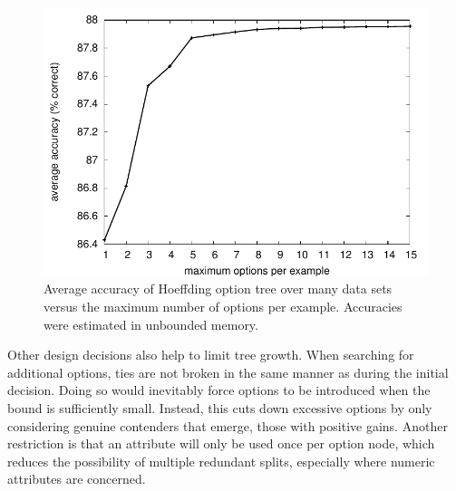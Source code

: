 \begin{figure}
\includegraphics{figures/maxOptionAcc}
\caption{Average accuracy of Hoeffding option tree over many data sets versus the maximum number of options per example. Accuracies were estimated in unbounded memory.}
\label{fig:maxOptionAcc}
\end{figure}

Other design decisions also help to limit tree growth. When searching for additional options, ties are not broken in the same manner as during the initial decision. Doing so would inevitably force options to be introduced when the bound is sufficiently small. Instead, this cuts down excessive options by only considering genuine contenders that emerge, those with positive gains. Another restriction is that an attribute will only be used once per option node, which reduces the possibility of multiple redundant splits, especially where numeric attributes are concerned.

